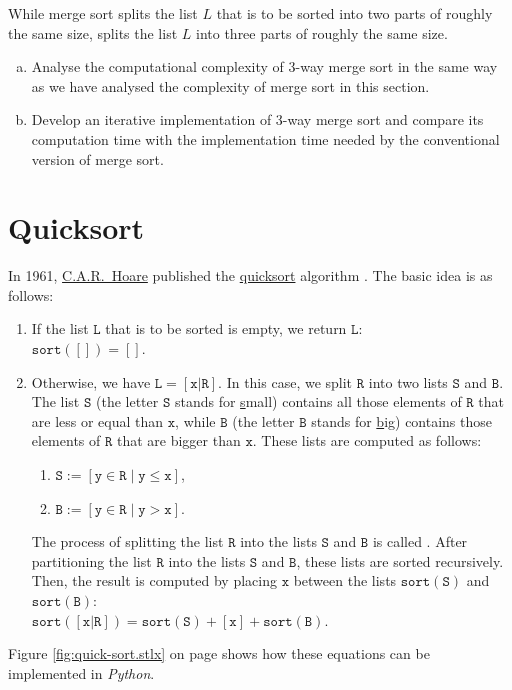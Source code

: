\exercise
While merge sort splits the list $L$ that is to be sorted into two parts of roughly the same size, 
 splits the list $L$ into three parts of roughly the same size.
\begin{enumerate}[(a)]
\item Analyse the computational complexity of 3-way merge sort in the same way as we have analysed the
      complexity of merge sort in this section.
\item Develop an iterative implementation of 3-way merge sort and compare its computation time with the 
      implementation time needed by the conventional version of merge sort.
      \eox
\end{enumerate}

\section{Quicksort}
In 1961, \href{http://en.wikipedia.org/wiki/Tony_Hoare}{C.A.R.~Hoare} published the
\href{http://en.wikipedia.org/wiki/Quicksort}{quicksort} algorithm \cite{hoare:61}.  The basic idea is as follows:
\begin{enumerate}
\item If the list $\mathtt{L}$ that is to be sorted is empty, we return $\mathtt{L}$: 
      \\[0.2cm]
      \hspace*{1.3cm} $\mathtt{sort}([]) = []$.
\item Otherwise, we have $\mathtt{L} = [\mathtt{x}|\mathtt{R}]$.  In this case, we split $\mathtt{R}$ into two lists $\mathtt{S}$ and $\mathtt{B}$.
      The list $\mathtt{S}$ (the letter $\mathtt{S}$ stands for \underline{s}mall) contains all those elements of $\mathtt{R}$ that are less
      or equal than $\mathtt{x}$,     while $\mathtt{B}$ (the letter $\mathtt{B}$ stands for \underline{b}ig) contains
      those elements of $\mathtt{R}$ that are bigger than $\mathtt{x}$.  These lists are computed as follows:
      \begin{enumerate}
      \item $\mathtt{S} := [\mathtt{y} \in \mathtt{R} \mid \mathtt{y} \leq \mathtt{x}]$,
      \item $\mathtt{B} := [\mathtt{y} \in \mathtt{R} \mid \mathtt{y} > \mathtt{x}]$.
      \end{enumerate}
      The process of splitting the list $\mathtt{R}$ into the lists $\mathtt{S}$ and $\mathtt{B}$
      is called .  After partitioning the list $\mathtt{R}$ into the lists $\mathtt{S}$ and $\mathtt{B}$, these lists are sorted
      recursively.  Then, the result is computed by placing $\mathtt{x}$ between the lists $\mathtt{sort}(\mathtt{S})$ and $\mathtt{sort}(\mathtt{B})$:
      \\[0.2cm]
      \hspace*{1.3cm}
      $\mathtt{sort}([\mathtt{x}|\mathtt{R}]) = \mathtt{sort}(\mathtt{S}) + [\mathtt{x}] + \mathtt{sort}(\mathtt{B})$.
\end{enumerate}
Figure \ref{fig:quick-sort.stlx} on page \pageref{fig:quick-sort.stlx} shows how these equations can
be implemented in \textsl{Python}.

